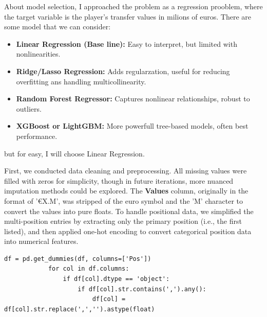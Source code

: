 \documentclass[a4paper,12pt]{article}
\begin{document}
\begin{itemize}[label= {*}, leftmargin= 1cm]
\begin{itemize}[label= {}, leftmargin= 1cm]
        About model selection, I approached the problem as a regression prooblem, where the target variable is the player's transfer values in milions of euros. There are some model that we can consider:
        \begin{itemize}[label= {+}, leftmargin= 1cm]
            \item \textbf{Linear Regression (Base line):} Easy to interpret, but limited with nonlinearities.
            \item \textbf{Ridge/Lasso Regression:} Adds regularzation, useful for reducing overfitting ans handling multicollinearity.
            \item \textbf{Random Forest Regressor:} Captures nonlinear relationships, robust to outliers.
            \item  \textbf{XGBoost or LightGBM:} More powerfull tree-based models, often best performance.
        \end{itemize}
        but for easy, I will choose Linear Regression.
        \vspace{0.3cm}

        First, we conducted data cleaning and preprocessing. All missing values were filled with zeros for simplicity, though in future iterations, more nuanced imputation methods could be explored. The \textbf{Values} column, originally in the format of '€X.M', was stripped of the euro symbol and the 'M' character to convert the values into pure floats. To handle positional data, we simplified the multi-position entries by extracting only the primary position (i.e., the first listed), and then applied one-hot encoding to convert categorical position data into numerical features.
        \vspace{0.3cm}

        \begin{Verbatim}[xleftmargin= -1.5cm]
            df = pd.get_dummies(df, columns=['Pos'])
            for col in df.columns:
                if df[col].dtype == 'object':
                    if df[col].str.contains(',').any():
                        df[col] = df[col].str.replace(',','').astype(float)
        \end{Verbatim}
        \vspace{0.3cm}


\end{itemize}
\end{itemize}
\end{document}
